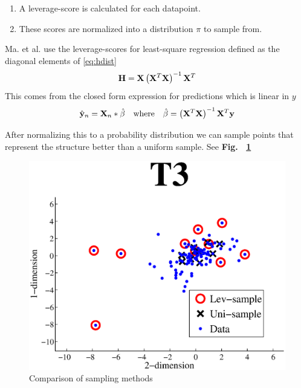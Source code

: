 \documentclass{article}
\begin{document}
\begin{enumerate}
\item A leverage-score is calculated for each datapoint.
\item These scores are normalized into a distribution $\pi$ to sample from.
\end{enumerate}

Ma. et al. \cite{Ma} use the leverage-scores for least-square regression defined as the diagonal elements of \eqref{eq:hdist}
\begin{equation}
{\bf H} = {\bf X} \left( {\bf X}^T {\bf X} \right)^{-1} {\bf X}^T
 \label{eq:hdist}
\end{equation}
This comes from the closed form expression for predictions which is linear in $y$
\begin{equation*}
	\hat{{\bf y}}_n = {\bf X}_n*\hat{\beta} \quad \text{where} \quad \hat{\beta} = \left( {\bf X}^T {\bf X} \right)^{-1} {\bf X}^T {\bf y} 
\end{equation*}

After normalizing this to a probability distribution we can sample  points that represent the structure better than a uniform sample. See {\bf Fig.~ \ref{fig:selection}}

\begin{figure}[t]
	\centering
    \includegraphics[width=.5\linewidth]{images/selection.eps}
    \caption{Comparison of sampling methods}
    \label{fig:selection}
\end{figure}
\end{document}
